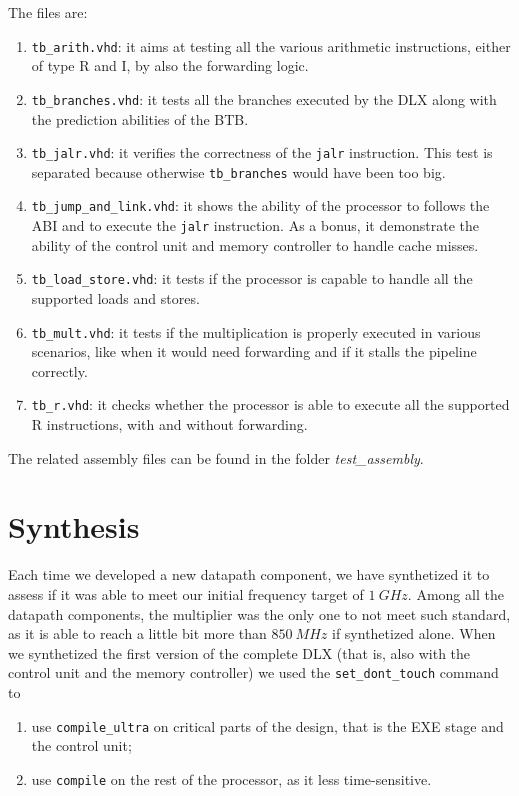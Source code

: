 The files are:
\begin{enumerate}
    \item \verb|tb_arith.vhd|: it aims at testing all the various arithmetic instructions, either of type R and I, by also the forwarding logic.
    \item \verb|tb_branches.vhd|: it tests all the branches executed by the DLX along with the prediction abilities of the BTB.
    \item \verb|tb_jalr.vhd|: it verifies the correctness of the \verb|jalr| instruction. This test is separated because otherwise \verb|tb_branches| would have been too big.
    \item \verb|tb_jump_and_link.vhd|: it shows the ability of the processor to follows the ABI and to execute the \verb|jalr| instruction. As a bonus, it demonstrate the ability of the control unit and memory controller to handle cache misses.
    \item \verb|tb_load_store.vhd|: it tests if the processor is capable to handle all the supported loads and stores.
    \item \verb|tb_mult.vhd|: it tests if the multiplication is properly executed in various scenarios, like when it would need forwarding and if it stalls the pipeline correctly.
    \item \verb|tb_r.vhd|: it checks whether the processor is able to execute all the supported R instructions, with and without forwarding.
\end{enumerate}

The related assembly files can be found in the folder {\it test\_assembly}.

\section{Synthesis}

Each time we developed a new datapath component, we have synthetized it to assess if it was able to meet our initial frequency target of $1\ GHz$. Among all the datapath components,
the multiplier was the only one to not meet such standard, as it is able to reach a little bit more than $850\ MHz$ if synthetized alone.
When we synthetized the first version of the complete DLX (that is, also with the control unit and the memory controller) we used the \verb|set_dont_touch| command to

\begin{enumerate}
    \item use \verb|compile_ultra| on critical parts of the design, that is the EXE stage and the control unit;
    \item use \verb|compile| on the rest of the processor, as it less time-sensitive.
\end{enumerate}


